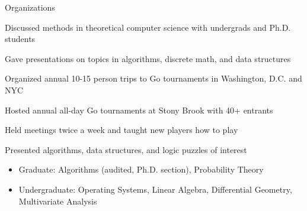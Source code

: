 \documentclass{cv}
\begin{document}
\begin{cvsection}{Organizations}
  {
    \item Discussed methods in theoretical computer science with undergrads and Ph.D. students
    \item Gave presentations on topics in algorithms, discrete math, and data structures
  }
  {
    \item Organized annual 10-15 person trips to Go tournaments in Washington, D.C. and NYC
    \item Hosted annual all-day Go tournaments at Stony Brook with 40+ entrants
    \item Held meetings twice a week and taught new players how to play
  }
  {
    \item Presented algorithms, data structures, and logic puzzles of interest
  } 
\end{cvsection}

\begin{minipage}{\textwidth}
  \begin{itemize}[noitemsep,topsep=0pt]%
    \item Graduate: Algorithms (audited, Ph.D. section), Probability Theory
    \item Undergraduate: Operating Systems, Linear Algebra, Differential Geometry, Multivariate Analysis
  \end{itemize}%
\end{minipage}%
\end{document}
